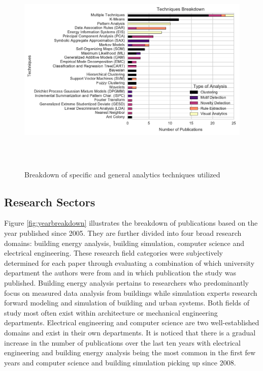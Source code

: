 \documentclass[preprint,12pt,3p]{elsarticle}
\begin{document}
\begin{figure}[H]
\centering
\includegraphics[height=4in]{./Data/Techniques}
\caption{Breakdown of specific and general analytics techniques utilized}
\label{fig:techbreakdown}
\end{figure}

\subsection{Research Sectors}
Figure \ref{fig:yearbreakdown} illustrates the breakdown of publications based on the year published since 2005. They are further divided into four broad research domains: building energy analysis, building simulation, computer science and electrical engineering. These research field categories were subjectively determined for each paper through evaluating a combination of which university department the authors were from and in which publication the study was published. Building energy analysis pertains to researchers who predominantly focus on measured data analysis from buildings while simulation experts research forward modeling and simulation of building and urban systems. Both fields of study most often exist within architecture or mechanical engineering departments. Electrical engineering and computer science are two well-established domains and exist in their own departments. It is noticed that there is a gradual increase in the number of publications over the last ten years with electrical engineering and building energy analysis being the most common in the first few years and computer science and building simulation picking up since 2008.  
\end{document}
